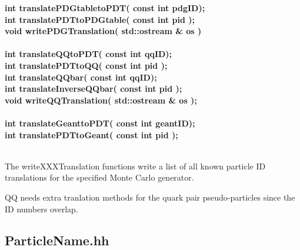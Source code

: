 \begin{tabbing}
\hspace{0.5in} {\bf int translatePDGtabletoPDT( const int pdgID);} \\
\hspace{0.5in} {\bf int translatePDTtoPDGtable( const int pid );} \\
\hspace{0.5in} {\bf void  writePDGTranslation( std::ostream \& os )} \\  \\

\hspace{0.5in} {\bf int translateQQtoPDT( const int qqID);} \\
\hspace{0.5in} {\bf int translatePDTtoQQ( const int pid );} \\
\hspace{0.5in} {\bf int translateQQbar( const int qqID);} \\
\hspace{0.5in} {\bf int translateInverseQQbar( const int pid );} \\
\hspace{0.5in} {\bf void  writeQQTranslation( std::ostream \& os );} \\  \\

\hspace{0.5in} {\bf int translateGeanttoPDT( const int geantID);} \\
\hspace{0.5in} {\bf int translatePDTtoGeant( const int pid );} \\  \\

\end{tabbing}

The writeXXXTranslation functions write a list of all known particle ID 
translations for the specified Monte Carlo generator.

QQ needs extra tranlation methods for the quark pair pseudo-particles since the 
ID numbers overlap.

\vfill\eject

\subsection {ParticleName.hh}

